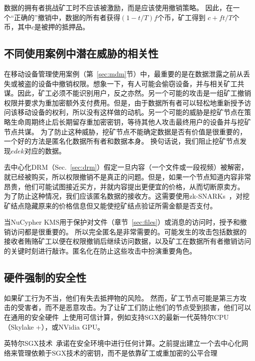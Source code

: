 \documentclass[longbibliography,nofootinbib]{revtex4-1}
\newcommand{\kms}{NuCypher KMS}
\begin{document}
    数据的拥有者挑战矿工时不应该被激励，而是应该使用撤销策略。 因此，在一个“正确的”撤销中，数据的所有者获得$(1 - t/T) f$个币，矿工得到 $c + ft/T$个币，其中$c$是被押的抵押品。
\subsection{不同使用案例中潜在威胁的相关性}


    在移动设备管理使用案例（第~\ref{sec:mdm}节）中，最重要的是在数据泄露之前从丢失或被盗的设备中撤销权限。想象一下，有人可能会偷窃设备，并与相关矿工共谋。因此，矿工必须不能识别用户，反之亦然。另一个可能的攻击是一组矿工撤销权限并要求为重加密额外支付费用。但是，由于数据所有者可以轻松地重新授予访问该移动设备的权利，所以没有这样做的动机。另一个可能的威胁是挖矿节点在策略生命周期终止后长期留存重加密密钥，等待其他人攻击最终用户的设备并与挖矿节点共谋。 为了防止这种威胁，挖矿节点不能确定数据是否有价值是很重要的，一个好的方法是匿名化数据所有者和数据本身。 换句话说，我们阻止挖矿节点发现$edek$对应的数据。
    
    去中心化DRM（Sec.~\ref{sec:drm}）假定一旦内容（一个文件或一段视频）被解密，就已经被购买，所以权限撤销不是真正的问题。但是，如果一个节点知道内容非常昂贵，他们可能试图接近买方，并就内容提出更便宜的价格，从而切断原卖方。 为了防止这种情况，我们应该匿名数据的接收方。这需要使用zk-SNARKs~\cite{consensys-snarks}，对挖矿结点隐藏原来的价格信息但又能使挖矿结点验证所需金额是否支付。


    当\kms 用于保护对文件（章节~\ref{sec:files}）或消息的访问时，授予和撤销访问都是很重要的。 所以完全匿名是非常需要的。可能发生的攻击包括数据的接收者贿赂矿工以便在权限撤销后继续访问数据，以及矿工在数据所有者撤销访问的关键时刻进行敲诈。匿名化在防止这些攻击中扮演重要角色。


\subsection{硬件强制的安全性}

        如果矿工行为不当，他们有失去抵押物的风险。 然而，矿工节点可能是第三方攻击的受害者，而不是恶意攻击。为了让矿工们防止他们的节点受到损害，他们可以在通用的安全硬件~\cite{Yang2011}上使用可信计算，例如支持SGX的最新一代英特尔CPU（Skylake +），或NVidia GPU。
    
    英特尔SGX技术~\cite{wiki:sgx}承诺在安全环境中进行任何计算。之前提出建立一个去中心化网络来管理依赖于SGX技术的密钥，而不是依靠矿工或重加密的公平合理~\cite{sgx-blockchain-encryption}
    
\end{document}
